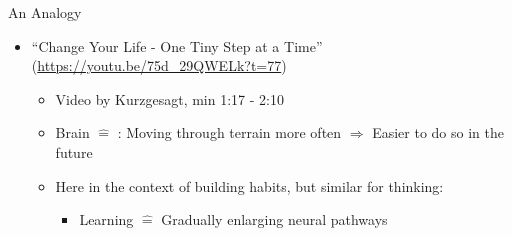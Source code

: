 \documentclass{ercisbeamer}
\begin{document}
\begin{frame}{An Analogy}
    \begin{tbox}
        \begin{itemize}
            \item ``Change Your Life - One Tiny Step at a Time'' (\url{https://youtu.be/75d_29QWELk?t=77})
            \begin{itemize}
                \item Video by Kurzgesagt, min 1:17 - 2:10
                \item Brain $\widehat =$ : Moving through terrain more often $\Rightarrow$ Easier to do so in the future
                \item Here in the context of building habits, but similar for thinking:
                \begin{itemize}
                    \item Learning $\widehat =$ Gradually enlarging neural pathways
                \end{itemize}
            \end{itemize}
        \end{itemize}
    \end{tbox}
\end{frame}
\setbgimage{}
\end{document}
